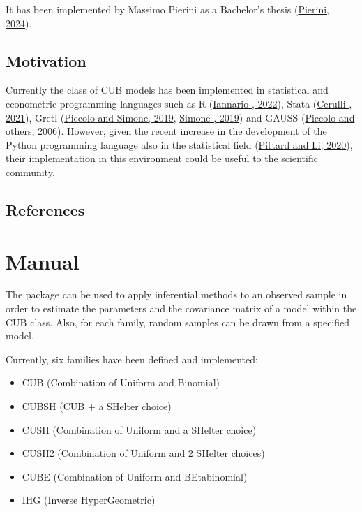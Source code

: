 \documentclass[letterpaper,10pt,english]{sphinxmanual}
\begin{document}
\sphinxAtStartPar
It has been implemented by Massimo Pierini as a Bachelor’s thesis (\hyperlink{cite.intro:id50}{Pierini, 2024}).


\section{Motivation}
\label{\detokenize{intro:motivation}}
\sphinxAtStartPar
Currently the class of CUB models has been implemented in statistical and econometric programming languages
such as R (\hyperlink{cite.intro:id31}{Iannario , 2022}), Stata (\hyperlink{cite.intro:id37}{Cerulli , 2021}),
Gretl (\hyperlink{cite.intro:id16}{Piccolo and Simone, 2019}, \hyperlink{cite.intro:id38}{Simone , 2019})
and GAUSS (\hyperlink{cite.intro:id20}{Piccolo and others, 2006}).  However, given the recent increase in the development
of the Python programming language also in the statistical field (\hyperlink{cite.intro:id36}{Pittard and Li, 2020}),
their implementation in
this environment could be useful to the scientific community.


\section{References}
\label{\detokenize{intro:references}}
\sphinxstepscope


\chapter{Manual}
\label{\detokenize{manual:manual}}\label{\detokenize{manual::doc}}
\sphinxAtStartPar
The package  can be used to apply inferential methods to an observed sample in order to
estimate the parameters and the covariance matrix of a model within the CUB class. Also, for each family,
random samples can be drawn from a specified model.

\sphinxAtStartPar
Currently, six families have been defined and implemented:
\begin{itemize}
\item {} 
\sphinxAtStartPar
CUB (Combination of Uniform and Binomial)

\item {} 
\sphinxAtStartPar
CUBSH (CUB + a SHelter choice)

\item {} 
\sphinxAtStartPar
CUSH (Combination of Uniform and a SHelter choice)

\item {} 
\sphinxAtStartPar
CUSH2 (Combination of Uniform and 2 SHelter choices)

\item {} 
\sphinxAtStartPar
CUBE (Combination of Uniform and BEta\sphinxhyphen{}binomial)

\item {} 
\sphinxAtStartPar
IHG (Inverse HyperGeometric)

\end{itemize}
\end{document}

